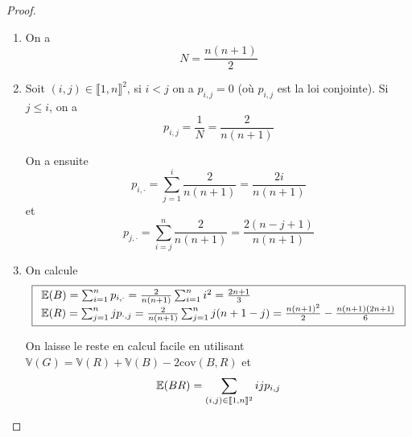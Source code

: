 \begin{proof}
    \phantom{}
    \begin{enumerate}
        \item On a 
        \begin{equation}
            \boxed{N=\frac{n(n+1)}{2}}
        \end{equation}

        \item Soit $(i,j)\in\llbracket1,n\rrbracket^{2}$, si $i<j$ on a $p_{i,j}=0$ (où $p_{i,j}$ est la loi conjointe). Si $j\leqslant i$, on a
        \begin{equation}
            p_{i,j}=\frac{1}{N}=\frac{2}{n(n+1)}
        \end{equation}

        On a ensuite 
        \begin{equation}
            \boxed{p_{i,\cdot}=\sum_{j=1}^{i}\frac{2}{n(n+1)}}=\frac{2i}{n(n+1)}
        \end{equation}
        et 
        \begin{equation}
            \boxed{p_{j,\cdot}}=\sum_{i=j}^{n}\frac{2}{n(n+1)}=\frac{2(n-j+1)}{n(n+1)}
        \end{equation}

        \item On calcule 
        \begin{equation}
            \boxed{
                \begin{array}[]{l}
                    \E(B)=\sum_{i=1}^{n}p_{i,\cdot}=\frac{2}{n(n+1)}\sum_{i=1}^{n}i^{2}=\frac{2n+1}{3}\\
                    \E(R)=\sum_{j=1}^{n}jp_{\cdot,j}=\frac{2}{n(n+1)}\sum_{j=1}^{n}j(n+1-j)=\frac{n(n+1)^{2}}{2}-\frac{n(n+1)(2n+1)}{6}
                \end{array}
            }
        \end{equation}

        On laisse le reste en calcul facile en utilisant $\mathbb{V}(G)=\mathbb{V}(R)+\mathbb{V}(B)-2\mathrm{cov}(B,R)$ et 
        \begin{equation}
            \mathbb{E}(BR)=\sum_{(i,j)\in\llbracket1,n\rrbracket^{2}}ijp_{i,j}
        \end{equation}
    \end{enumerate}
\end{proof}

